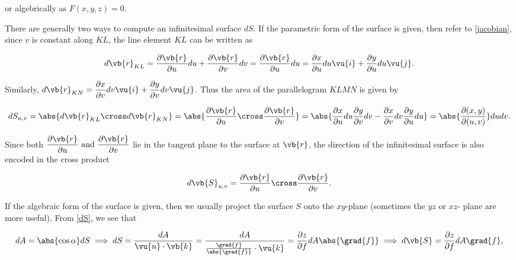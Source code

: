 \documentclass[english,a4paper,12pt]{report}
\begin{document}
or algebrically as \(F(x,y,z) = 0\). 

There are generally two ways to compute an infinitesimal surface \(dS\). If the parametric form of the surface is given, then refer to \cref{jacobian}, since \(v\) is constant along \(KL\), the line element \(KL\) can be written as 

\begin{equation}
	d\vb{r} _{KL} = \frac{\partial \vb{r} }{\partial u}du+ \frac{\partial \vb{r} }{\partial v}dv = \frac{\partial \vb{r} }{\partial u}du = \frac{\partial x}{\partial u} du \vu{i} + \frac{\partial y}{\partial u} du \vu{j}.
\end{equation}

Similarly, \(\displaystyle d\vb{r} _{KN}  = \frac{\partial x}{\partial v} dv \vu{i} + \frac{\partial y}{\partial v} dv \vu{j}\). Thus the area of the parallelogram \(KLMN\) is given by

\begin{equation}
	dS_{u,v} = \abs{d\vb{r} _{KL} \cross  d\vb{r} _{KN}} = \abs{\frac{\partial \vb{r} }{\partial u} \cross \frac{\partial \vb{r} }{\partial v} } = \abs{\frac{\partial x}{\partial u} du \frac{\partial y}{\partial v} dv - \frac{\partial x}{\partial v} dv \frac{\partial y}{\partial u} du} = \abs{\frac{\partial (x,y)}{\partial (u,v)} } dudv.
\end{equation}

Since both \(\displaystyle \frac{\partial \vb{r} }{\partial u} \text { and } \frac{\partial \vb{r} }{\partial v}  \) lie in the tangent plane to the surface at \(\vb{r} \), the direction of the infinitesimal surface is also encoded in the cross product

\begin{equation}
	d\vb{S} _{u,v} = \frac{\partial \vb{r} }{\partial u} \cross \frac{\partial \vb{r} }{\partial v}.   
\end{equation}



If the algebraic form of the surface is given, then we usually project the surface \(S\) onto the \(xy\)-plane (sometimes the \(yz \text { or } xz\)- plane are more useful). From \cref{dS}, we see that 

\begin{equation} \label{dseq} 
	dA = \abs{\cos \alpha }dS \implies dS = \frac{dA}{\vu{n} \cdot \vb{k} } = \frac{dA}{\frac{\grad{f} }{\abs{\grad{f} } } \cdot \vu{k}  } =  \frac{\partial z}{\partial f}dA\abs{\grad{f} } \implies d\vb{S} = \frac{\partial z}{\partial f} dA\grad{f} , 
\end{equation}
\end{document}
